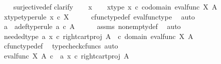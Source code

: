 \begin{isabellebody}
%
\isadelimproof
\ \ %
\endisadelimproof
%
\isatagproof
{}\isamarkupfalse%
\ surjective{\isacharunderscore}{\kern0pt}def\isanewline
{}\isamarkupfalse%
{\isacharparenleft}{\kern0pt}clarify{\isacharparenright}{\kern0pt}\isanewline
\ \ \isamarkupfalse%
\ x\isanewline
\ \ \isamarkupfalse%
\ x{\isacharunderscore}{\kern0pt}type{\isacharcolon}{\kern0pt}\ {\isachardoublequoteopen}x\ {\isasymin}\isactrlsub c\ codomain\ {\isacharparenleft}{\kern0pt}eval{\isacharunderscore}{\kern0pt}func\ X\ A{\isacharparenright}{\kern0pt}{\isachardoublequoteclose}\isanewline
\ \ \isamarkupfalse%
\ \isamarkupfalse%
\ x{\isacharunderscore}{\kern0pt}type{}{\isacharbrackleft}{\kern0pt}type{\isacharunderscore}{\kern0pt}rule{\isacharbrackright}{\kern0pt}{\isacharcolon}{\kern0pt}\ {\isachardoublequoteopen}x\ {\isasymin}\isactrlsub c\ X{\isachardoublequoteclose}\isanewline
\ \ \ \ \isamarkupfalse%
\ cfunc{\isacharunderscore}{\kern0pt}type{\isacharunderscore}{\kern0pt}def\ eval{\isacharunderscore}{\kern0pt}func{\isacharunderscore}{\kern0pt}type\ \isamarkupfalse%
\ auto\isanewline
\ \ \isamarkupfalse%
\ a\ \ a{\isacharunderscore}{\kern0pt}def{\isacharbrackleft}{\kern0pt}type{\isacharunderscore}{\kern0pt}rule{\isacharbrackright}{\kern0pt}{\isacharcolon}{\kern0pt}\ {\isachardoublequoteopen}a\ {\isasymin}\isactrlsub c\ A{\isachardoublequoteclose}\isanewline
\ \ \ \ \isamarkupfalse%
\ assms\ nonempty{\isacharunderscore}{\kern0pt}def\ \isamarkupfalse%
\ auto\isanewline
\ \ \isamarkupfalse%
\ needed{\isacharunderscore}{\kern0pt}type{\isacharcolon}{\kern0pt}\ {\isachardoublequoteopen}{\isasymlangle}a{\isacharcomma}{\kern0pt}\ {\isacharparenleft}{\kern0pt}x\ {\isasymcirc}\isactrlsub c\ right{\isacharunderscore}{\kern0pt}cart{\isacharunderscore}{\kern0pt}proj\ A\ {\isasymone}{\isacharparenright}{\kern0pt}\isactrlsup {\isasymsharp}{\isasymrangle}\ {\isasymin}\isactrlsub c\ domain\ {\isacharparenleft}{\kern0pt}eval{\isacharunderscore}{\kern0pt}func\ X\ A{\isacharparenright}{\kern0pt}{\isachardoublequoteclose}\isanewline
\ \ \ \ \isamarkupfalse%
\ cfunc{\isacharunderscore}{\kern0pt}type{\isacharunderscore}{\kern0pt}def\ \isamarkupfalse%
\ {\isacharparenleft}{\kern0pt}typecheck{\isacharunderscore}{\kern0pt}cfuncs{\isacharcomma}{\kern0pt}\ auto{\isacharparenright}{\kern0pt}\isanewline
\ \ \isamarkupfalse%
\ {\isachardoublequoteopen}{\isacharparenleft}{\kern0pt}eval{\isacharunderscore}{\kern0pt}func\ X\ A{\isacharparenright}{\kern0pt}\ {\isasymcirc}\isactrlsub c\ \ {\isasymlangle}a{\isacharcomma}{\kern0pt}\ {\isacharparenleft}{\kern0pt}x\ {\isasymcirc}\isactrlsub c\ right{\isacharunderscore}{\kern0pt}cart{\isacharunderscore}{\kern0pt}proj\ A\ {\isasymone}{\isacharparenright}{\kern0pt}\isactrlsup {\isasymsharp}{\isasymrangle}\ {\isacharequal}{\kern0pt}\ \ \ \ \isanewline

\end{isabellebody}
